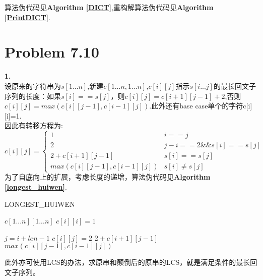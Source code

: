 \documentclass[onecolumn]{ctexart}
\begin{document}
\indent 算法伪代码见\textbf{Algorithm \ref{DICT}},重构解算法伪代码见\textbf{Algorithm \ref{PrintDICT}}.

\section*{Problem 7.10}
\noindent \textbf{1.}\\
\indent 设原来的字符串为$s[1...n]$,新建$c[1...n,1...n]$,$c[i][j]$指示$s[i...j]$的最长回文子序列的长度：如果$s[i]==s[j]$，则$c[i][j]=c[i+1][j-1]+2$,否则$c[i][j]=max(c[i][j-1],c[i-1][j])$.此外还有base case单个的字符c[i][i]=1.\\
\indent 因此有转移方程为:\\
\[
c[i][j]=
\begin{cases}
	1 & i==j\\
	2 & j-i==2\&\&s[i]==s[j]\\
	2+c[i+1][j-1] &s[i]==s[j]\\
	max(c[i][j-1],c[i-1][j]) & s[i]\ne s[j]
\end{cases}
\]
\indent 为了自底向上的扩展，考虑长度的递增，算法伪代码见\textbf{Algorithm \ref{longest_huiwen}}.\\
\begin{algorithm}[htbp]
	\caption{LONGEST\_HUIWEN}
	\label{longest_huiwen}
	\begin{algorithmic}[1]
		\STATE $c[1...n][1...n]$
			\STATE $c[i][i]=1$
		\ENDFOR
		
				\STATE $j=i+len-1$
						\STATE $c[i][j]=2$
					\ELSE
						\STATE $2+c[i+1][j-1]$
					\ENDIF				
				\ELSE
					\STATE $max(c[i][j-1],c[i-1][j])$
				\ENDIF
			\ENDFOR
		\ENDFOR
	\end{algorithmic}
\end{algorithm}
\indent 此外亦可使用LCS的办法，求原串和颠倒后的原串的LCS，就是满足条件的最长回文子序列。\\
\end{document}
